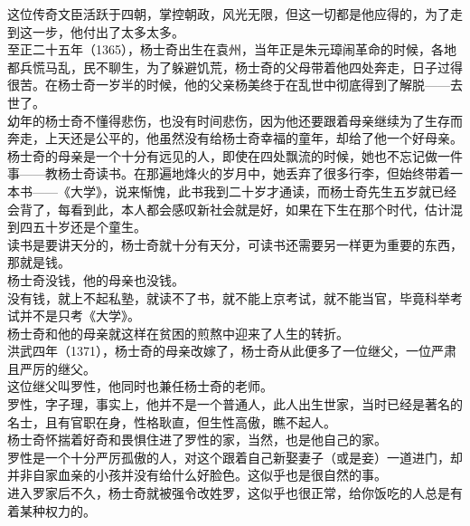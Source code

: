 \begin{multicols}{\theparacolNo}
这位传奇文臣活跃于四朝，掌控朝政，风光无限，但这一切都是他应得的，为了走到这一步，他付出了太多太多。\\

至正二十五年（1365），杨士奇出生在袁州，当年正是朱元璋闹革命的时候，各地都兵慌马乱，民不聊生，为了躲避饥荒，杨士奇的父母带着他四处奔走，日子过得很苦。在杨士奇一岁半的时候，他的父亲杨美终于在乱世中彻底得到了解脱——去世了。\\

幼年的杨士奇不懂得悲伤，也没有时间悲伤，因为他还要跟着母亲继续为了生存而奔走，上天还是公平的，他虽然没有给杨士奇幸福的童年，却给了他一个好母亲。\\

杨士奇的母亲是一个十分有远见的人，即使在四处飘流的时候，她也不忘记做一件事——教杨士奇读书。在那遍地烽火的岁月中，她丢弃了很多行李，但始终带着一本书——《大学》，说来惭愧，此书我到二十岁才通读，而杨士奇先生五岁就已经会背了，每看到此，本人都会感叹新社会就是好，如果在下生在那个时代，估计混到四五十岁还是个童生。\\

读书是要讲天分的，杨士奇就十分有天分，可读书还需要另一样更为重要的东西，那就是钱。\\

杨士奇没钱，他的母亲也没钱。\\

没有钱，就上不起私塾，就读不了书，就不能上京考试，就不能当官，毕竟科举考试并不是只考《大学》。\\

杨士奇和他的母亲就这样在贫困的煎熬中迎来了人生的转折。\\

洪武四年（1371），杨士奇的母亲改嫁了，杨士奇从此便多了一位继父，一位严肃且严厉的继父。\\

这位继父叫罗性，他同时也兼任杨士奇的老师。\\

罗性，字子理，事实上，他并不是一个普通人，此人出生世家，当时已经是著名的名士，且有官职在身，性格耿直，但生性高傲，瞧不起人。\\

杨士奇怀揣着好奇和畏惧住进了罗性的家，当然，也是他自己的家。\\

罗性是一个十分严厉孤傲的人，对这个跟着自己新娶妻子（或是妾）一道进门，却并非自家血亲的小孩并没有给什么好脸色。这似乎也是很自然的事。\\

进入罗家后不久，杨士奇就被强令改姓罗，这似乎也很正常，给你饭吃的人总是有着某种权力的。\\


\end{multicols}

